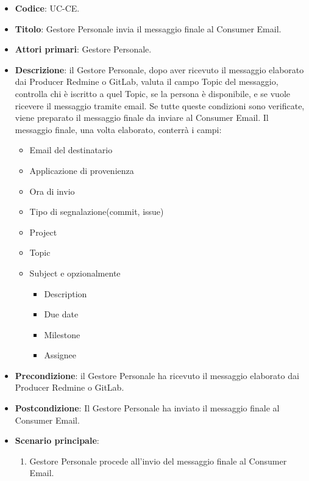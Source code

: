 	\begin{itemize}
		\item \textbf{Codice}: UC\theuccount-CE.
		\item \textbf{Titolo}: Gestore Personale invia il messaggio finale al Consumer Email.
		\item \textbf{Attori primari}: Gestore Personale.
		\item \textbf{Descrizione}: il Gestore Personale, dopo aver ricevuto il messaggio elaborato dai Producer Redmine o GitLab, valuta il campo Topic del messaggio, controlla chi è iscritto a quel Topic, se la persona è disponibile, e se vuole ricevere il messaggio tramite email. Se tutte queste condizioni sono verificate, viene preparato il messaggio finale da inviare al Consumer Email. Il messaggio finale, una volta elaborato, conterrà i campi:
		\begin{itemize}
			\item Email del destinatario
			\item Applicazione di provenienza
			\item Ora di invio
			\item Tipo di segnalazione(commit, issue)
			\item Project
			\item Topic
			\item Subject e opzionalmente
		 	\begin{itemize}
				\item Description
				\item Due date
				\item Milestone
				\item Assignee
			\end{itemize}
		\end{itemize}
		\item \textbf{Precondizione}: il Gestore Personale ha ricevuto il messaggio elaborato dai Producer Redmine o GitLab.
		\item \textbf{Postcondizione}: Il Gestore Personale ha inviato il messaggio finale al Consumer Email.
		\item \textbf{Scenario principale}: 
		\begin{enumerate}
			\item Gestore Personale procede all'invio del messaggio finale al Consumer Email.
		\end{enumerate}
		
	\end{itemize}